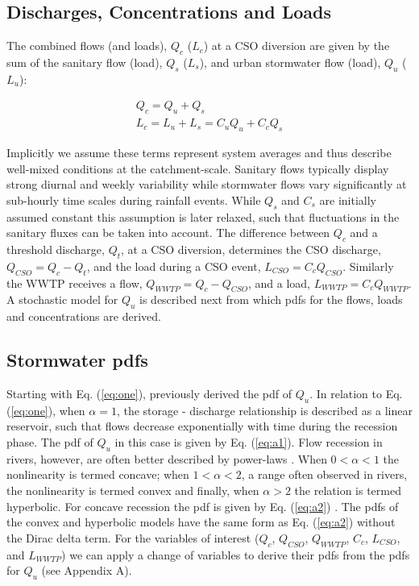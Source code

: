 \documentclass[draft,linenumbers]{agujournal2018}
\begin{document}
\subsection{Discharges, Concentrations and Loads}
The combined f\/lows (and loads), $Q_c$ ($L_c$) at a CSO diversion are given by the sum of the sanitary f\/low (load), $Q_s$ ($L_s$), and urban stormwater f\/low (load), $Q_u$ ($L_u$):
\begin{linenomath*}
 \begin{eqnarray}
Q_c = Q_u + Q_s\\
\label{eq:two}
L_c = L_u + L_s = C_u Q_u + C_c Q_s
\label{eq:three}
\end{eqnarray}
\end{linenomath*}
Implicitly we assume these terms represent system averages and thus describe well-mixed conditions at the catchment-scale. Sanitary f\/lows typically display strong diurnal and weekly variability while stormwater f\/lows vary signif\/icantly at sub-hourly time scales during rainfall events. While $Q_s$ and $C_s$ are initially assumed constant this assumption is later relaxed, such that f\/luctuations in the sanitary f\/luxes can be taken into account. The dif\/ference between $Q_c$ and a threshold discharge, $Q_t$, at a CSO diversion, determines the CSO discharge, $Q_{CSO} = Q_c - Q_t$, and the load during a CSO event, $L_{CSO} = C_c Q_{CSO}$. Similarly the WWTP receives a f\/low, $Q_{WWTP} = Q_c - Q_{CSO}$, and a load, $L_{WWTP} = C_c Q_{WWTP}$. A stochastic model for $Q_u$ is described next from which pdfs for the f\/lows, loads and concentrations are derived. 

  
\subsection{Stormwater pdfs}
Starting with Eq. (\ref{eq:one}), \citet{Botter_2009} previously derived the pdf of $Q_u$. In relation to Eq. (\ref{eq:one}), when $\alpha = 1$, the storage - discharge relationship is described as a linear reservoir, such that f\/lows decrease exponentially with time during the recession phase. The pdf of $Q_u$ in this case is given by Eq. (\ref{eq:a1}). Flow recession in rivers, however, are often better described by power-laws \citep{Wittenberg_1999}. When $0 < \alpha < 1$ the nonlinearity is termed concave; when $1 < \alpha < 2$, a range often observed in rivers, the nonlinearity is termed convex and f\/inally, when $\alpha > 2$ the relation is termed hyperbolic. For concave recession the pdf is given by Eq. (\ref{eq:a2}) \citep{Botter_2009}. The pdfs of the convex and hyperbolic models have the same form as Eq. (\ref{eq:a2}) without the Dirac delta term. For the variables of interest ($Q_c$, $Q_{CSO}$, $Q_{WWTP}$, $C_c$, $L_{CSO}$, and $L_{WWTP}$) we can apply a change of variables to derive their pdfs from the pdfs for $Q_u$ (see Appendix A). 
\end{document}
